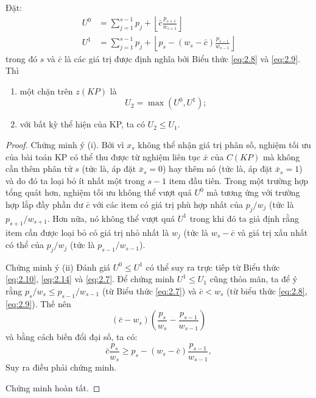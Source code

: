 \begin{theorem}
    Đặt:
    \begin{align}
        \label{eq:2.14}
        U^0 &= \sum_{j = 1}^{s - 1}p_j + \left \lfloor\bar{c}\frac{p_{s+1}}{w_{s+1}} \right \rfloor\\
        \label{eq:2.15}
        U^1 &= \sum_{j = 1}^{s - 1}p_j + \left \lfloor p_s - (w_s - \bar{c})\frac{p_{s-1}}{w_{s-1}}\right \rfloor
    \end{align}
    trong đó $s$ và $\bar{c}$ là các giá trị được định nghĩa bởi Biểu thức \eqref{eq:2.8} và \eqref{eq:2.9}. Thì
    \begin{enumerate}[label=(\alph*)]
        \item một chặn trên $z(KP)$ là
        \begin{equation}
            \label{eq:2.16}
            U_2 = \max(U^0, U^1);
        \end{equation}
        \item với bất kỳ thể hiện của KP, ta có $U_2 \leq U_1$.
    \end{enumerate}
\end{theorem}
\begin{proof}
    Chứng minh ý (i). Bởi vì $x_s$ không thể nhận giá trị phân số, nghiệm tối ưu của bài toán KP có thể thu được từ nghiệm liên tục $\bar{x}$ của $C(KP)$ mà không cần thêm phân tử $s$ (tức là, áp đặt $\bar{x}_s = 0$) hay thêm nó (tức là, áp đặt $\bar{x}_s = 1$) và do đó ta loại bỏ ít nhất một trong $s - 1$ item đầu tiên. Trong một trường hợp tổng quát hơn, nghiệm tối ưu không thể vượt quá $U^0$ mà tương ứng với trường hợp lắp đầy phần dư $\bar{c}$ với các item có giá trị phù hợp nhất của $p_j / w_j$ (tức là $p_{s + 1} / w_{s + 1}$. Hơn nữa, nó không thể vượt quá $U^1$ trong khi đó ta giả định rằng item cần được loại bỏ có giá trị nhỏ nhất là $w_j$ (tức là $w_s - \bar{c}$ và giá trị xấu nhất có thể của $p_j / w_j$ (tức là $p_{s - 1} / w_{s - 1}$).

    Chứng minh ý (ii) Đánh giá $U^0 \leq U^1$ có thể suy ra trực tiếp từ Biểu thức \eqref{eq:2.10}, \eqref{eq:2.14} và \eqref{eq:2.7}. Để chứng minh $U^1 \leq U_1$ cũng thỏa mãn, ta để ý rằng $p_s / w_s \leq p_{s - 1} / w_{s - 1}$ (từ Biểu thức \eqref{eq:2.7}) và $\bar{c} < w_s$ (từ biểu thức \eqref{eq:2.8}, \eqref{eq:2.9}). Thế nên
    \begin{equation*}
        (\bar{c} - w_s)\left(\frac{p_s}{w_s} - \frac{p_{s-1}}{w_{s-1}}\right)
    \end{equation*}
    và bằng cách biến đổi đại số, ta có:
    \begin{equation*}
        \bar{c}\frac{p_s}{w_s} \geq p_s - (w_s - \bar{c})\frac{p_{s-1}}{w_{s-1}},
    \end{equation*}
    Suy ra điều phải chứng minh.

    Chứng minh hoàn tất.
\end{proof}

